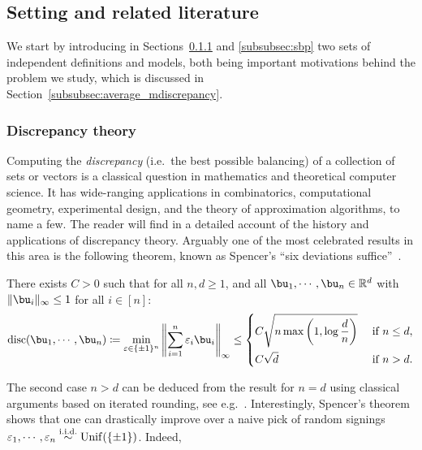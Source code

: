 \subsection{Setting and related literature}

We start by introducing in Sections~\ref{subsubsec:discrepancy} and \ref{subsubsec:sbp} two sets of independent definitions and models,
both being important motivations behind the problem we study, which is discussed in Section~\ref{subsubsec:average_mdiscrepancy}.

\subsubsection{Discrepancy theory}\label{subsubsec:discrepancy}

Computing the \emph{discrepancy} (i.e.\ the best possible balancing) of a collection of sets or vectors 
is a classical question in mathematics and theoretical computer science. 
It has wide-ranging applications in combinatorics, computational geometry,
experimental design, and the theory of approximation algorithms, to name a few. 
The reader will find in \cite{spencer1994ten,matousek2009geometric,chen2014panorama} a detailed account of the history and applications of 
discrepancy theory.
Arguably one of the most celebrated results in this area is the following theorem, known as Spencer's ``six deviations suffice''~\citep{spencer1985six}.
\begin{theorem}
    \label{thm:spencer}
    There exists $C > 0$ such that for all $n, d \geq 1$, and all $\bu_1, \cdots, \bu_n \in \bbR^d$ with $\|\bu_i\|_\infty \leq 1$ for all $i \in [n]$: 
    \begin{equation*}
       \disc(\bu_1, \cdots, \bu_n) \coloneqq \min_{\eps \in \{\pm 1\}^n} \left\|\sum_{i=1}^n \eps_i \bu_i\right\|_\infty \leq
       \begin{dcases}
       C \sqrt{n \max \left(1, \log \frac{d}{n}\right)} &\textrm{ if } n \leq d, \\
       C \sqrt{d} &\textrm{ if } n > d.
       \end{dcases}
    \end{equation*}
\end{theorem}
\noindent
The second case $n > d$ can be deduced from the result for $n = d$ using classical arguments based on iterated rounding, see e.g.~\cite{spencer1994ten}.
Interestingly, Spencer's theorem shows that one can drastically improve over a naive pick of random signings $\varepsilon_1, \cdots, \varepsilon_n \overset{\mathrm{i.i.d.}}{\sim} \mathrm{Unif}(\{\pm 1\})$. Indeed, 
